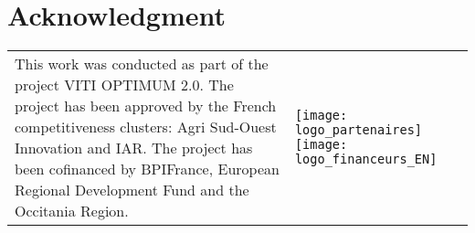 \documentclass[a4paper,conference]{IEEEtran}
\begin{document}



\section*{Acknowledgment}
\setlength{\tabcolsep}{0.1cm}
\begin{tabular}{m{}m{}}
This work was conducted as part of the project VITI OPTIMUM 2.0. %
The project has been approved by the French competitiveness clusters: Agri Sud-Ouest Innovation and IAR. The project has been cofinanced by BPIFrance, European Regional Development Fund and the Occitania Region. 
&
\begin{center}
\texttt{[image: logo\_partenaires]} 
\texttt{[image: logo\_financeurs\_EN]}
\end{center}
\\\end{tabular}
\end{document}
